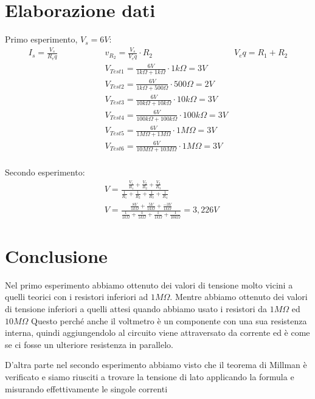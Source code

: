     
    \section{Elaborazione dati}
    Primo esperimento, $V_s = 6V$:
    \begin{align*}
        I_s = \frac{V_s}{R_eq}  \hspace{2cm}   & v_{R_2} = \frac{V_s}{V_eq} \cdot R_2  \hspace{2cm} &  V_eq = R_1 + R_2 \\
        & V_{Test1} = \frac{6V}{1k\Omega + 1k\Omega} \cdot 1k\Omega = 3V \\
        & V_{Test2} = \frac{6V}{1k\Omega + 500\Omega} \cdot 500\Omega = 2V \\
        & V_{Test3} = \frac{6V}{10k\Omega + 10k\Omega} \cdot 10k\Omega = 3V \\
        & V_{Test4} = \frac{6V}{100k\Omega + 100k\Omega} \cdot 100k\Omega = 3V \\
        & V_{Test5} = \frac{6V}{1M\Omega + 1M\Omega} \cdot 1M\Omega = 3V \\
        & V_{Test6} = \frac{6V}{10M\Omega + 10M\Omega} \cdot 1M\Omega = 3V \\
    \end{align*}

    Secondo esperimento:
    \begin{align*}
       & V = \frac{\frac{V_1}{R_1} + \frac{V_2}{R_2} + \frac{V_3}{R_3}}{\frac{1}{R_1} + \frac{1}{R_2} + \frac{1}{R_3} + \frac{1}{R_4}}\\
       & V = \frac{\frac{8V}{1k\Omega} + \frac{5V}{1k\Omega} + \frac{-3V}{1k\Omega}}{\frac{1}{1k\Omega} + \frac{1}{1k\Omega} + \frac{1}{1k\Omega} + \frac{1}{10k\Omega}} = 3,226V
    \end{align*}
    


    \section{Conclusione}
    Nel primo esperimento abbiamo ottenuto dei valori di tensione molto vicini a quelli teorici con i resistori inferiori ad $1M\Omega$.
    Mentre abbiamo ottenuto dei valori di tensione inferiori a quelli attesi quando abbiamo usato i resistori da $1M\Omega$ ed $10M\Omega$
    Questo perché anche il voltmetro è un componente con una sua resistenza interna, quindi aggiungendolo al circuito
    viene attraversato da corrente ed è come se ci fosse un ulteriore resistenza in parallelo.

    D'altra parte nel secondo esperimento abbiamo visto che il teorema di Millman è verificato e siamo riusciti a trovare la tensione
    di lato applicando la formula e misurando effettivamente le singole correnti 


